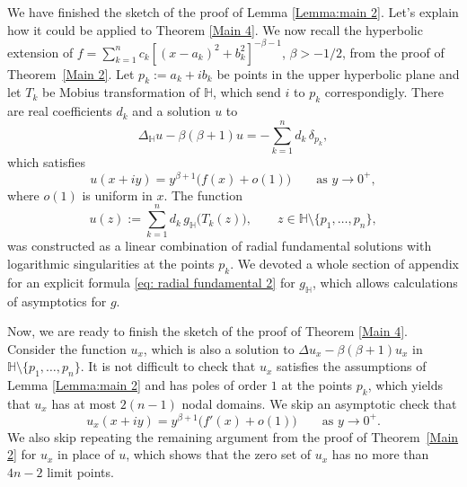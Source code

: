 \documentclass{article}
\begin{document}
We have finished the sketch of the proof of Lemma \ref{Lemma:main 2}. Let's explain how it could be applied to Theorem \ref{Main 4}. We now recall the hyperbolic extension of $f=\sum_{k=1}^{n}c_{k}[(x-a_{k})^{2}+b_{k}^{2}]^{-\beta-1}$, $\beta>-1/2$, from the proof of
Theorem~\ref{Main 2}. Let $p_k:=a_k+ib_k$ be points in the upper hyperbolic plane and let $T_k$ be Mobius transformation of $\mathbb{H}$, which send $i$ to $p_k$ correspondigly. There are real coefficients $d_k$ and a solution $u$ to
\[
\Delta_{\mathbb H}u-\beta(\beta+1) u
  = -\sum_{k=1}^n d_k\,\delta_{p_k},
\]
which satisfies
\begin{equation}\label{eq:normalised-trace 2}
  u(x+iy)
    = y^{\beta+1}\bigl(f(x)+o(1)\bigr)
    \qquad\text{as }y\to0^+,
\end{equation}
where $o(1)$ is uniform in $x$. The function 
\[
u(z)
  := \sum_{k=1}^n d_k\,g_{\mathbb H}\bigl(T_k(z)\bigr),
  \qquad z\in\mathbb H\setminus\{p_1,\dots,p_n\},
\]
was constructed as a linear combination of radial fundamental solutions with logarithmic singularities at the points $p_k$.   We devoted a whole section of appendix for an explicit formula \eqref{eq: radial fundamental 2} for $g_\mathbb{H}$, which allows calculations of asymptotics for $g$.

Now, we are ready to finish the sketch of the proof of Theorem \ref{Main 4}. 
Consider the function $u_x$, which is also a solution to $\Delta u_x-\beta(\beta+1)u_x$ in $\mathbb{H}\setminus\{p_1,\dots,p_n\}$. It is not difficult to check that $u_x$ satisfies the assumptions of Lemma \ref{Lemma:main 2} and has poles of order $1$ at the points $p_k$, which yields that $u_x$ has at most $2(n-1)$ nodal domains. We skip  an asymptotic check that 
\begin{equation}
  u_x(x+iy)
    = y^{\beta+1}\bigl(f'(x)+o(1)\bigr)
    \qquad\text{as }y\to0^+.
\end{equation}
We also skip repeating the remaining argument from the proof of Theorem~\ref{Main 2} for $u_x$ in place of $u$, which shows that the zero set of $u_x$ has no more than $4n-2$ limit points. 
\end{document}
